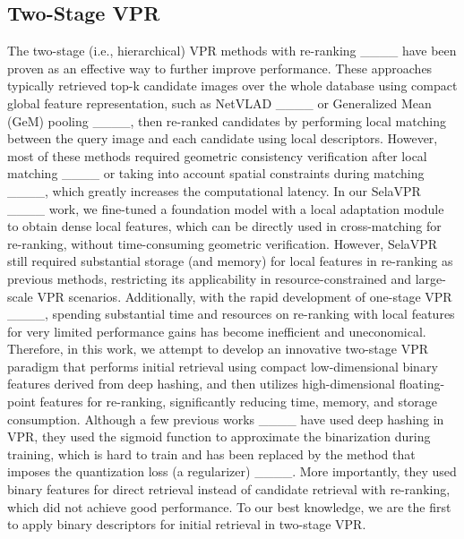\subsection{Two-Stage VPR}
\label{sec:2stagevpr}
The two-stage (i.e., hierarchical) VPR methods with re-ranking ____ have been proven as an effective way to further improve performance. These approaches typically retrieved top-k candidate images over the whole database using compact global feature representation, such as NetVLAD ____ or Generalized Mean (GeM) pooling ____, then re-ranked candidates by performing local matching between the query image and each candidate using local descriptors. However, most of these methods required geometric consistency verification after local matching ____ or taking into account spatial constraints during matching ____, which greatly increases the computational latency. In our SelaVPR ____ work, we fine-tuned a foundation model with a local adaptation module to obtain dense local features, which can be directly used in cross-matching for re-ranking, without time-consuming geometric verification. However, SelaVPR still required substantial storage (and memory) for local features in re-ranking as previous methods, restricting its applicability in resource-constrained and large-scale VPR scenarios. Additionally, with the rapid development of one-stage VPR ____, spending substantial time and resources on re-ranking with local features for very limited performance gains has become inefficient and uneconomical. Therefore, in this work, we attempt to develop an innovative two-stage VPR paradigm that performs initial retrieval using compact low-dimensional binary features derived from deep hashing, and then utilizes high-dimensional floating-point features for re-ranking, significantly reducing time, memory, and storage consumption. Although a few previous works ____ have used deep hashing in VPR, they used the sigmoid function to approximate the binarization during training, which is hard to train and has been replaced by the method that imposes the quantization loss (a regularizer) ____. More importantly, they used binary features for direct retrieval instead of candidate retrieval with re-ranking, which did not achieve good performance. To our best knowledge, we are the first to apply binary descriptors for initial retrieval in two-stage VPR.

